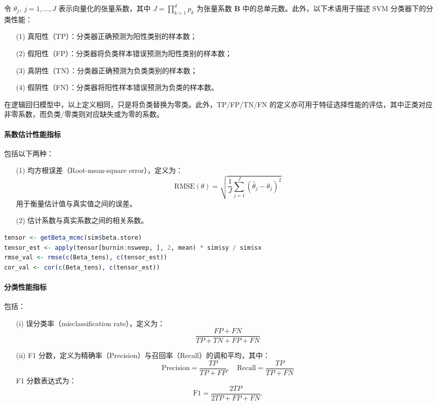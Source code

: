 \documentclass[AutoFakeBold]{LZUThesis}
\begin{document}
令 $\theta_j,~j=1,\dots,J$ 表示向量化的张量系数，其中 $J = \prod_{k=1}^d p_k$ 为张量系数 $\boldsymbol{B}$ 中的总单元数。此外，以下术语用于描述 SVM 分类器下的分类性能：
\begin{itemize}
	\item [(1)]真阳性（TP）：分类器正确预测为阳性类别的样本数；
	\item [(2)]假阳性（FP）：分类器将负类样本错误预测为阳性类别的样本数；
	\item [(3)]真阴性（TN）：分类器正确预测为负类类别的样本数；
	\item [(4)]假阴性（FN）：分类器将阳性样本错误预测为负类的样本数。
\end{itemize}

在逻辑回归模型中，以上定义相同，只是将负类替换为零类。此外，TP/FP/TN/FN 的定义亦可用于特征选择性能的评估，其中正类对应非零系数，而负类/零类则对应缺失或为零的系数。

\paragraph{系数估计性能指标} 包括以下两种：
\begin{itemize}
	\item[(1)] 均方根误差（Root-mean-square error），定义为：
	\begin{equation}
		\mathrm{RMSE}(\theta) = \sqrt{ \frac{1}{J} \sum_{j=1}^{J} (\hat{\theta}_j - \theta_j)^2 }
		\label{Equation:RMSE}
	\end{equation}
	用于衡量估计值与真实值之间的误差。
	\item[(2)] 估计系数与真实系数之间的相关系数。
\end{itemize}

\begin{lstlisting}[language=R]
tensor <- getBeta_mcmc(sim$beta.store)
tensor_est <- apply(tensor[burnin:nsweep, ], 2, mean) * sim$sy / sim$sx
rmse_val <- rmse(c(Beta_tens), c(tensor_est))
cor_val <- cor(c(Beta_tens), c(tensor_est))
\end{lstlisting}
\paragraph{分类性能指标} 包括：
\begin{itemize}
	\item[(i)] 误分类率（misclassification rate），定义为：
	\begin{equation}
		\frac{FP + FN}{TP + TN + FP + FN}
		\label{Equation:MisClaRate}
	\end{equation}
	
	\item[(ii)] F1 分数，定义为精确率（Precision）与召回率（Recall）的调和平均，其中：
	\begin{equation}
		\text{Precision} = \frac{TP}{TP + FP}, \quad \text{Recall} = \frac{TP}{TP + FN}
		\label{Equation:PrecisionandRecall}
	\end{equation}
	F1 分数表达式为：
	\begin{equation}
		\mathrm{F1} = \frac{2TP}{2TP + FP + FN}.
		\label{F1-score}
	\end{equation}
\end{itemize}
\end{document}

